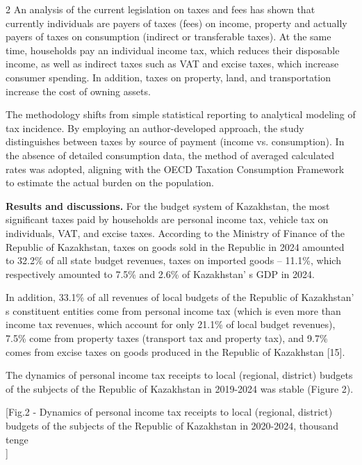 \begin{multicols}{2}
An analysis of the current legislation on taxes and fees has shown that
currently individuals are payers of taxes (fees) on income, property and
actually payers of taxes on consumption (indirect or transferable
taxes). At the same time, households pay an individual income tax, which
reduces their disposable income, as well as indirect taxes such as VAT
and excise taxes, which increase consumer spending. In addition, taxes
on property, land, and transportation increase the cost of owning
assets.

The methodology shifts from simple statistical reporting to analytical
modeling of tax incidence. By employing an author-developed approach,
the study distinguishes between taxes by source of payment (income vs.
consumption). In the absence of detailed consumption data, the method of
averaged calculated rates was adopted, aligning with the OECD Taxation
Consumption Framework to estimate the actual burden on the population.

{\bfseries Results and discussions.} For the budget system of Kazakhstan,
the most significant taxes paid by households are personal income tax,
vehicle tax on individuals, VAT, and excise taxes. According to the
Ministry of Finance of the Republic of Kazakhstan, taxes on goods sold
in the Republic in 2024 amounted to 32.2\% of all state budget revenues,
taxes on imported goods -- 11.1\%, which respectively amounted to 7.5\%
and 2.6\% of Kazakhstan' s GDP in 2024.

In addition, 33.1\% of all revenues of local budgets of the Republic of
Kazakhstan' s constituent entities come from personal
income tax (which is even more than income tax revenues, which account
for only 21.1\% of local budget revenues), 7.5\% come from property
taxes (transport tax and property tax), and 9.7\% comes from excise
taxes on goods produced in the Republic of Kazakhstan {[}15{]}.

The dynamics of personal income tax receipts to local (regional,
district) budgets of the subjects of the Republic of Kazakhstan in
2019-2024 was stable (Figure 2).
\end{multicols}

[Fig.2 - Dynamics of personal income tax receipts to
local (regional, district) budgets of the subjects of the Republic of
Kazakhstan in 2020-2024, thousand tenge\\]

